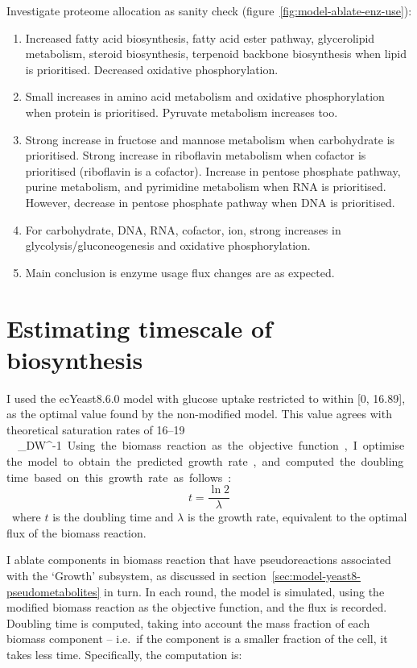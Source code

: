 Investigate proteome allocation as sanity check (figure~\ref{fig:model-ablate-enz-use}):

\begin{enumerate}
  \item Increased fatty acid biosynthesis, fatty acid ester pathway, glycerolipid metabolism, steroid biosynthesis, terpenoid backbone biosynthesis when lipid is prioritised.
        Decreased oxidative phosphorylation.
  \item Small increases in amino acid metabolism and oxidative phosphorylation when protein is prioritised.
        Pyruvate metabolism increases too.
  \item Strong increase in fructose and mannose metabolism when carbohydrate is prioritised.
        Strong increase in riboflavin metabolism when cofactor is prioritised (riboflavin is a cofactor).
        Increase in pentose phosphate pathway, purine metabolism, and pyrimidine metabolism when RNA is prioritised.
        However, decrease in pentose phosphate pathway when DNA is prioritised.
  \item For carbohydrate, DNA, RNA, cofactor, ion, strong increases in glycolysis/gluconeogenesis and oxidative phosphorylation.
  \item Main conclusion is enzyme usage flux changes are as expected.
\end{enumerate}

\section{Estimating timescale of biosynthesis}
\label{sec:model-timescale}

I used the ecYeast8.6.0 model with glucose uptake restricted to within [0, 16.89], as the optimal value found by the non-modified model.
This value agrees with theoretical saturation rates of 16--19 \SI{}{\milli\mol~\gram_{DW}^{-1}}.
Using the biomass reaction as the objective function, I optimise the model to obtain the predicted growth rate, and computed the doubling time based on this growth rate as follows:

\begin{equation}
  t = \frac{\ln 2}{\lambda}
  \label{eq:model-doubling-time}
\end{equation}

where $t$ is the doubling time and $\lambda$ is the growth rate, equivalent to the optimal flux of the biomass reaction.

I ablate components in biomass reaction that have pseudoreactions associated with the `Growth' subsystem, as discussed in section~\ref{sec:model-yeast8-pseudometabolites} in turn.
In each round, the model is simulated, using the modified biomass reaction as the objective function, and the flux is recorded.
Doubling time is computed, taking into account the mass fraction of each biomass component -- i.e.\ if the component is a smaller fraction of the cell, it takes less time.
Specifically, the computation is:

